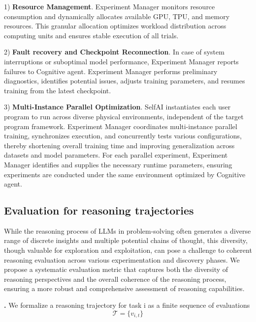 1) {\bf Resource Management}. Experiment Manager monitors resource consumption and dynamically allocates available GPU, TPU, and memory resources. This granular allocation optimizes workload distribution across computing units and ensures stable execution of all trials.

2) {\bf Fault recovery and Checkpoint Reconnection}. In case of system interruptions or suboptimal model performance, Experiment Manager reports failures to Cognitive agent. Experiment Manager performs preliminary diagnostics, identifies potential issues, adjusts training parameters, and resumes training from the latest checkpoint.

3) {\bf Multi-Instance Parallel Optimization}. SelfAI instantiates each user program to run across diverse physical environments, independent of the target program framework. Experiment Manager coordinates multi-instance parallel training, synchronizes execution, and concurrently tests various configurations, thereby shortening overall training time and improving generalization across datasets and model parameters. For each parallel experiment, Experiment Manager identifies and supplies the necessary runtime parameters, ensuring experiments are conducted under the same environment optimized by Cognitive agent.


\subsection{
Evaluation for reasoning trajectories}
\label{sec:evaluation_reasoning}
While the reasoning process of LLMs in problem-solving often generates a diverse range of discrete insights and multiple potential chains of thought, this diversity, though valuable for exploration and exploitation, can pose a challenge to coherent reasoning evaluation across various experimentation and discovery phases. We propose a systematic evaluation metric that captures both the diversity of reasoning perspectives and the overall coherence of the reasoning process, ensuring a more robust and comprehensive assessment of reasoning capabilities.


\noindent\textbf{.}
We formalize a reasoning trajectory for task i as a finite sequence of evaluations
\begin{equation}
    \mathcal{T} = \{v_{i,t}\}
\end{equation}

